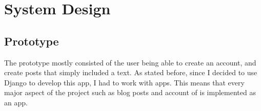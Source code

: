 
\chapter {System Design}

\section{Prototype}
The prototype mostly consisted of the user being able to create an account, and create posts that simply included a text. As stated before, since I decided to use Django to develop this app, I had to work with apps. This means that every major aspect of the project such as blog posts and account of is implemented as an app.


